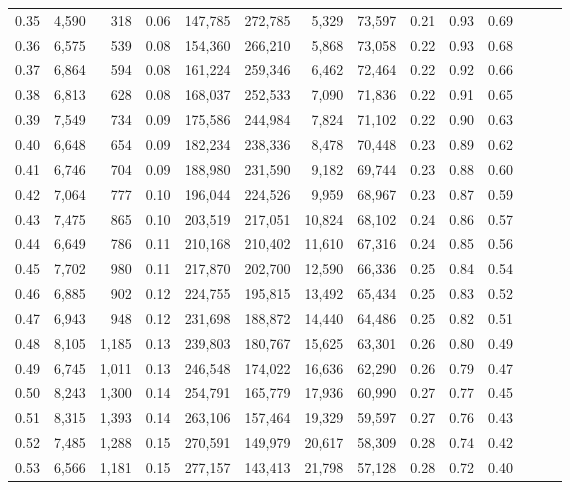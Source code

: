 \begin{tabular}{rrrrrrrrrrrrrr}
0.35 &  4,590 &    318 &  0.06 &  147,785 &  272,785 &   5,329 &  73,597 &  0.21 &  0.93 &      0.69 \\
0.36 &  6,575 &    539 &  0.08 &  154,360 &  266,210 &   5,868 &  73,058 &  0.22 &  0.93 &      0.68 \\
0.37 &  6,864 &    594 &  0.08 &  161,224 &  259,346 &   6,462 &  72,464 &  0.22 &  0.92 &      0.66 \\
0.38 &  6,813 &    628 &  0.08 &  168,037 &  252,533 &   7,090 &  71,836 &  0.22 &  0.91 &      0.65 \\
0.39 &  7,549 &    734 &  0.09 &  175,586 &  244,984 &   7,824 &  71,102 &  0.22 &  0.90 &      0.63 \\
0.40 &  6,648 &    654 &  0.09 &  182,234 &  238,336 &   8,478 &  70,448 &  0.23 &  0.89 &      0.62 \\
0.41 &  6,746 &    704 &  0.09 &  188,980 &  231,590 &   9,182 &  69,744 &  0.23 &  0.88 &      0.60 \\
0.42 &  7,064 &    777 &  0.10 &  196,044 &  224,526 &   9,959 &  68,967 &  0.23 &  0.87 &      0.59 \\
0.43 &  7,475 &    865 &  0.10 &  203,519 &  217,051 &  10,824 &  68,102 &  0.24 &  0.86 &      0.57 \\
0.44 &  6,649 &    786 &  0.11 &  210,168 &  210,402 &  11,610 &  67,316 &  0.24 &  0.85 &      0.56 \\
0.45 &  7,702 &    980 &  0.11 &  217,870 &  202,700 &  12,590 &  66,336 &  0.25 &  0.84 &      0.54 \\
0.46 &  6,885 &    902 &  0.12 &  224,755 &  195,815 &  13,492 &  65,434 &  0.25 &  0.83 &      0.52 \\
0.47 &  6,943 &    948 &  0.12 &  231,698 &  188,872 &  14,440 &  64,486 &  0.25 &  0.82 &      0.51 \\
0.48 &  8,105 &  1,185 &  0.13 &  239,803 &  180,767 &  15,625 &  63,301 &  0.26 &  0.80 &      0.49 \\
0.49 &  6,745 &  1,011 &  0.13 &  246,548 &  174,022 &  16,636 &  62,290 &  0.26 &  0.79 &      0.47 \\
0.50 &  8,243 &  1,300 &  0.14 &  254,791 &  165,779 &  17,936 &  60,990 &  0.27 &  0.77 &      0.45 \\
0.51 &  8,315 &  1,393 &  0.14 &  263,106 &  157,464 &  19,329 &  59,597 &  0.27 &  0.76 &      0.43 \\
0.52 &  7,485 &  1,288 &  0.15 &  270,591 &  149,979 &  20,617 &  58,309 &  0.28 &  0.74 &      0.42 \\
0.53 &  6,566 &  1,181 &  0.15 &  277,157 &  143,413 &  21,798 &  57,128 &  0.28 &  0.72 &      0.40 \\

\end{tabular}
